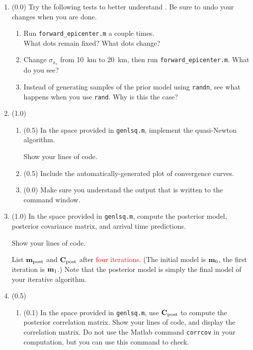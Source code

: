\documentclass[11pt,titlepage,fleqn]{article}
\begin{document}
\begin{enumerate}

\item (0.0) Try the following tests to better understand . Be sure to undo your changes when you are done.
%
\begin{enumerate}
\item Run \verb+forward_epicenter.m+ a couple times. \\
What dots remain fixed? What dots change?

\item Change $\sigma_{x_s}$ from 10~km to 20~km, then run \verb+forward_epicenter.m+. What do you see?

\item Instead of generating samples of the prior model using \verb+randn+, see what happens when you use \verb+rand+. Why is this the case?
\end{enumerate}

\item (1.0)
%
\begin{enumerate}
\item (0.5) In the space provided in \verb+genlsq.m+, implement the quasi-Newton algorithm.

Show your lines of code.

\item (0.5) Include the automatically-generated plot of convergence curves.

\item (0.0) Make sure you understand the output that is written to the command window.
\end{enumerate}


\item (1.0) In the space provided in \verb+genlsq.m+, compute the posterior model, posterior covariance matrix, and arrival time predictions.

Show your lines of code.

List $\mbox{${\bf m}$}_{\rm post}$ and $\mbox{${\bf C}$}_{\rm post}$ after \textcolor{red}{four iterations}. (The initial model is $\mbox{${\bf m}$}_0$, the first iteration is $\mbox{${\bf m}$}_1$.) Note that the posterior model is simply the final model of your iterative algorithm.


\item (0.5) 
\begin{enumerate}
\item (0.1) In the space provided in \verb+genlsq.m+, use $\mbox{${\bf C}$}_{\rm post}$ to compute the posterior correlation matrix. Show your lines of code, and display the correlation matrix. Do not use the Matlab command \verb+corrcov+ in your computation, but you can use this command to check.


\end{enumerate}
\end{enumerate}
\end{document}
